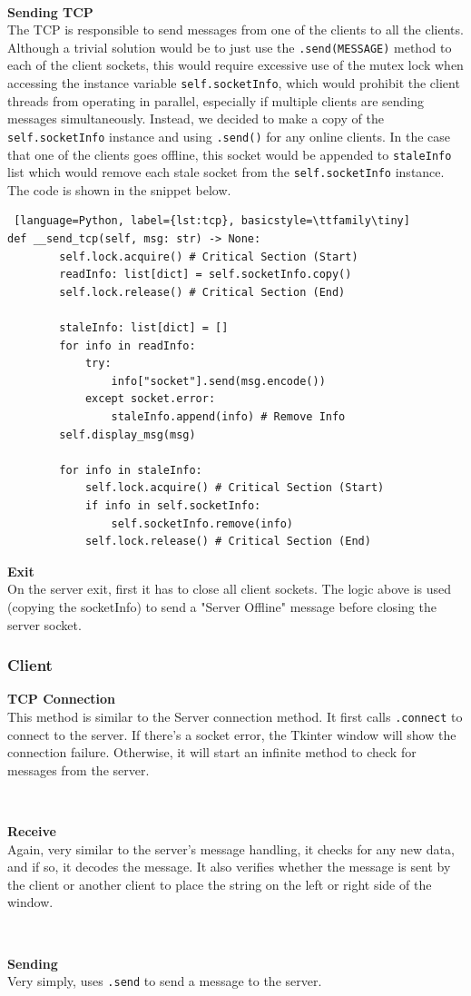 \documentclass{article}
\begin{document}
\

{\small \textbf{Sending TCP}} \\
The TCP is responsible to send messages from one of the clients to all the clients. Although a trivial solution would be to just use the \texttt{.send(MESSAGE)} method to each of the client sockets, this would require excessive use of the mutex lock when accessing the instance variable \texttt{self.socketInfo}, which would prohibit the client threads from operating in parallel, especially if multiple clients are sending messages simultaneously. Instead, we decided to make a copy of the \texttt{self.socketInfo} instance and using \texttt{.send()} for any online clients. In the case that one of the clients goes offline, this socket would be appended to \texttt{staleInfo} list which would remove each stale socket from the \texttt{self.socketInfo} instance. The code is shown in the snippet below.

\begin{lstlisting} [language=Python, label={lst:tcp}, basicstyle=\ttfamily\tiny]
def __send_tcp(self, msg: str) -> None:
        self.lock.acquire() # Critical Section (Start)
        readInfo: list[dict] = self.socketInfo.copy()
        self.lock.release() # Critical Section (End)

        staleInfo: list[dict] = []
        for info in readInfo:
            try:
                info["socket"].send(msg.encode())
            except socket.error:
                staleInfo.append(info) # Remove Info
        self.display_msg(msg)

        for info in staleInfo:
            self.lock.acquire() # Critical Section (Start)
            if info in self.socketInfo:
                self.socketInfo.remove(info)
            self.lock.release() # Critical Section (End)
\end{lstlisting}


{\small \textbf{Exit}}\\
On the server exit, first it has to close all client sockets. The logic above is used (copying the socketInfo) to send a "Server Offline" message before closing the server socket.

\subsubsection{Client}
{\small \textbf{TCP Connection}} \\
This method is similar to the Server connection method. It first calls \texttt{.connect} to connect to the server. If there's a socket error, the Tkinter window will show the connection failure. Otherwise, it will start an infinite method to check for messages from the server.

\

{\small \textbf{Receive}} \\
Again, very similar to the server's message handling, it checks for any new data, and if so, it decodes the message. It also verifies whether the message is sent by the client or another client to place the string on the left or right side of the window.

\

{\small \textbf{Sending}} \\
Very simply, uses \texttt{.send} to send a message to the server.
\end{document}

